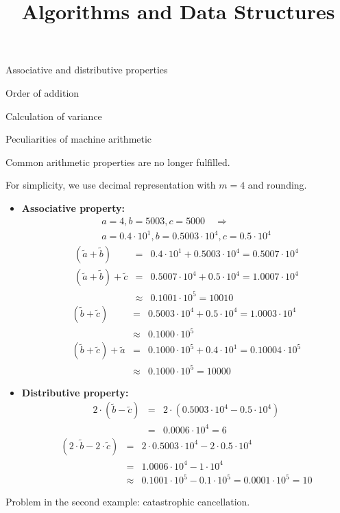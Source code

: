 \documentclass[11pt,compress,t,notes=noshow, xcolor=table]{beamer}
\title{Algorithms and Data Structures}
\begin{document}
{
  \item Associative and distributive properties
  \item Order of addition
  \item Calculation of variance
}



\begin{vbframe}{Peculiarities of machine arithmetic}

Common arithmetic properties are no longer fulfilled.

\vspace*{0.1cm}

For simplicity, we use decimal representation with $m = 4$ and rounding.

\begin{itemize}
\item \textbf{Associative property:}
 \begin{eqnarray*}
 &a = 4, b = 5003, c = 5000 \quad \Rightarrow \quad& \\
 &a = 0.4 \cdot 10^1, b = 0.5003 \cdot 10^4, c = 0.5 \cdot 10^4&
 \end{eqnarray*}
 \begin{eqnarray*}
 (\tilde a + \tilde b) &=& 0.4 \cdot 10^1 + 0.5003 \cdot 10^4 = 0.5007 \cdot 10^4 \\
 (\tilde a + \tilde b) + \tilde c &=& 0.5007 \cdot 10^4 + 0.5 \cdot 10^4 = 1.0007 \cdot 10^4 \\
 &\approx& 0.1001 \cdot 10^5 = 10010
 \end{eqnarray*}
 \begin{eqnarray*}
 (\tilde b + \tilde c) &=& 0.5003 \cdot 10^4 + 0.5 \cdot 10^4 = 1.0003 \cdot 10^4 \\
 &\approx& 0.1000 \cdot 10^5 \\
 (\tilde b + \tilde c) + \tilde a &=& 0.1000 \cdot 10^5 + 0.4 \cdot 10^1 = 0.10004 \cdot 10^5 \\
 &\approx& 0.1000 \cdot 10^5 = 10000
 \end{eqnarray*}

 \framebreak

\item \textbf{Distributive property:}
 \begin{eqnarray*}
 2 \cdot (\tilde b - \tilde c) &=& 2 \cdot (0.5003 \cdot 10^4 - 0.5 \cdot 10^4) \\
 &=& 0.0006 \cdot 10^4 = 6
 \end{eqnarray*}
 \begin{eqnarray*}
 (2 \cdot \tilde b - 2 \cdot \tilde c) &=& 2 \cdot 0.5003 \cdot 10^4 - 2 \cdot 0.5 \cdot 10^4 \\
 &=& 1.0006 \cdot 10^4 - 1 \cdot 10^4 \\
 &\approx& 0.1001 \cdot 10^5 - 0.1 \cdot 10^5 = 0.0001 \cdot 10^5 = 10
 \end{eqnarray*}
\end{itemize}
Problem in the second example: catastrophic cancellation.
\end{vbframe}
\end{document}
